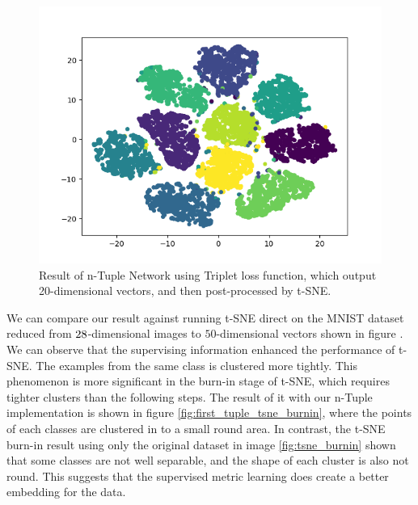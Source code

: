 \documentclass[10pt,twocolumn,letterpaper]{article}
\begin{document}
			\begin{figure}[htbp]
				\begin{center}
					\includegraphics[width=0.9\linewidth]{first_tuple_tsne}
				\end{center}
				\caption{Result of n-Tuple Network using Triplet loss function, which output 20-dimensional vectors, and then post-processed by t-SNE.\label{fig:first_tuple_tsne}}
			\end{figure}
			
			We can compare our result against running t-SNE direct on the MNIST dataset reduced from $28\time 28$-dimensional images to $50$-dimensional vectors shown in figure \label{fig:tsne}. We can observe that the supervising information enhanced the performance of t-SNE. The examples from the same class is clustered more tightly. This phenomenon is more significant in the burn-in stage of t-SNE, which requires tighter clusters than the following steps. The result of it with our n-Tuple implementation is shown in figure \ref{fig:first_tuple_tsne_burnin}, where the points of each classes are clustered in to a small round area. In contrast, the t-SNE burn-in result using only the original dataset in image \ref{fig:tsne_burnin} shown that some classes are not well separable, and the shape of each cluster is also not round. This suggests that the supervised metric learning does create a better embedding for the data.
			
\end{document}
